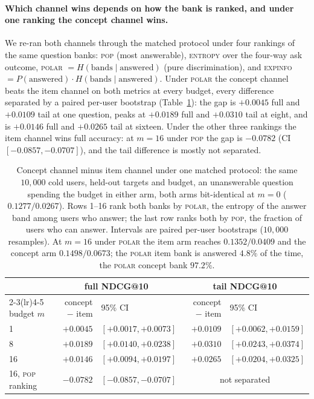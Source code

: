 \documentclass[manuscript,screen,review]{acmart}
\begin{document}
\paragraph{Which channel wins depends on how the bank is ranked, and under one ranking the concept channel wins.} We re-ran both channels through the matched protocol under four rankings of the same question banks: \textsc{pop} (most answerable), \textsc{entropy} over the four-way ask outcome, \textsc{polar} $=H(\text{bands}\mid\text{answered})$ (pure discrimination), and \textsc{expinfo} $=P(\text{answered})\cdot H(\text{bands}\mid\text{answered})$. Under \textsc{polar} the concept channel beats the item channel on both metrics at every budget, every difference separated by a paired per-user bootstrap (Table~\ref{tab:polar}): the gap is $+0.0045$ full and $+0.0109$ tail at one question, peaks at $+0.0189$ full and $+0.0310$ tail at eight, and is $+0.0146$ full and $+0.0265$ tail at sixteen. Under the other three rankings the item channel wins full accuracy: at $m{=}16$ under \textsc{pop} the gap is $-0.0782$ (CI $[-0.0857,-0.0707]$), and the tail difference is mostly not separated.

\begin{table}[t]\centering\small
\setlength{\tabcolsep}{5pt}
\begin{tabular}{l r@{\;}l r@{\;}l}
\toprule
& \multicolumn{2}{c}{full NDCG@10} & \multicolumn{2}{c}{tail NDCG@10} \\
\cmidrule(lr){2-3}\cmidrule(lr){4-5}
budget $m$ & concept $-$ item & 95\% CI & concept $-$ item & 95\% CI \\
\midrule
1  & $+0.0045$ & $[+0.0017,+0.0073]$ & $+0.0109$ & $[+0.0062,+0.0159]$ \\
8  & $+0.0189$ & $[+0.0140,+0.0238]$ & $+0.0310$ & $[+0.0243,+0.0374]$ \\
16 & $+0.0146$ & $[+0.0094,+0.0197]$ & $+0.0265$ & $[+0.0204,+0.0325]$ \\
\midrule
16, \textsc{pop} ranking & $-0.0782$ & $[-0.0857,-0.0707]$ & \multicolumn{2}{c}{not separated} \\
\bottomrule
\end{tabular}
\caption{Concept channel minus item channel under one matched protocol: the same $10{,}000$ cold users, held-out targets and budget, an unanswerable question spending the budget in either arm, both arms bit-identical at $m{=}0$ ($0.1277/0.0267$). Rows 1--16 rank both banks by \textsc{polar}, the entropy of the answer band among users who answer; the last row ranks both by \textsc{pop}, the fraction of users who can answer. Intervals are paired per-user bootstraps ($10{,}000$ resamples). At $m{=}16$ under \textsc{polar} the item arm reaches $0.1352/0.0409$ and the concept arm $0.1498/0.0673$; the \textsc{polar} item bank is answered $4.8\%$ of the time, the \textsc{polar} concept bank $97.2\%$.}
\label{tab:polar}
\end{table}
\end{document}
